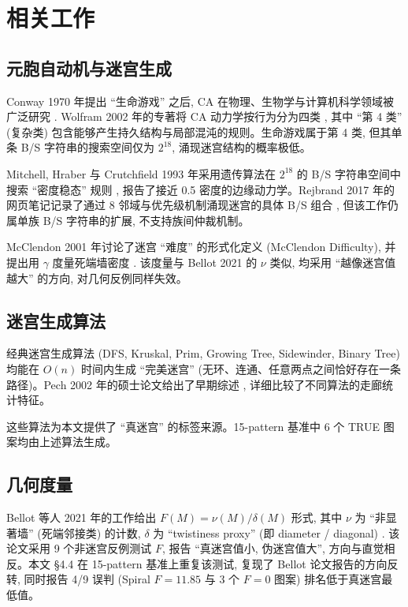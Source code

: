 
\section{相关工作}
\label{sec:related}

\subsection{元胞自动机与迷宫生成}

Conway 1970 年提出 ``生命游戏'' 之后, CA 在物理、生物学与计算机科学领域被广泛研究 \cite{conway1970}. Wolfram 2002 年的专著将 CA 动力学按行为分为四类 \cite{wolfram2002}, 其中 ``第 4 类'' (复杂类) 包含能够产生持久结构与局部混沌的规则。生命游戏属于第 4 类, 但其单条 B/S 字符串的搜索空间仅为 $2^{18}$, 涌现迷宫结构的概率极低。

Mitchell, Hraber 与 Crutchfield 1993 年采用遗传算法在 $2^{18}$ 的 B/S 字符串空间中搜索 ``密度稳态'' 规则 \cite{mitchell1993}, 报告了接近 0.5 密度的边缘动力学。Rejbrand 2017 年的网页笔记记录了通过 8 邻域与优先级机制涌现迷宫的具体 B/S 组合 \cite{rejbrand2017}, 但该工作仍属单族 B/S 字符串的扩展, 不支持族间仲裁机制。

McClendon 2001 年讨论了迷宫 ``难度'' 的形式化定义 (McClendon Difficulty), 并提出用 $\gamma$ 度量死端墙密度 \cite{mcclendon2001}. 该度量与 Bellot 2021 的 $\nu$ 类似, 均采用 ``越像迷宫值越大'' 的方向, 对几何反例同样失效。

\subsection{迷宫生成算法}

经典迷宫生成算法 (DFS, Kruskal, Prim, Growing Tree, Sidewinder, Binary Tree) 均能在 $O(n)$ 时间内生成 ``完美迷宫'' (无环、连通、任意两点之间恰好存在一条路径)。Pech 2002 年的硕士论文给出了早期综述 \cite{pech2002}, 详细比较了不同算法的走廊统计特征。

这些算法为本文提供了 ``真迷宫'' 的标签来源。15-pattern 基准中 6 个 TRUE 图案均由上述算法生成。

\subsection{几何度量}

Bellot 等人 2021 年的工作给出 $F(M) = \nu(M) / \delta(M)$ 形式, 其中 $\nu$ 为 ``非显著墙'' (死端邻接类) 的计数, $\delta$ 为 ``twistiness proxy'' (即 diameter / diagonal) \cite{bellot2021}. 该论文采用 9 个非迷宫反例测试 $F$, 报告 ``真迷宫值小, 伪迷宫值大'', 方向与直觉相反。本文 §4.4 在 15-pattern 基准上重复该测试, 复现了 Bellot 论文报告的方向反转, 同时报告 4/9 误判 (Spiral $F = 11.85$ 与 3 个 $F = 0$ 图案) 排名低于真迷宫最低值。

